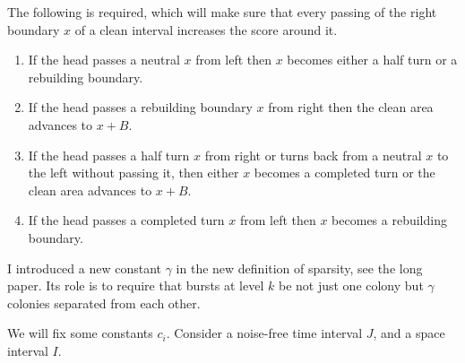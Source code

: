 \documentclass[12pt]{memoir}
\newcommand{\authnote}[3]
{\text{{ \textcolor{#3}{\( \langle\hspace{-0.2em}\langle \)\textsf{\footnotesize #1: #2}\( \rangle\hspace{-0.2em}\rangle \)}}}}
\newcommand{\authnote}[2]{}
\newcommand{\Pnote}[1]{{\authnote{P}{#1}{cyan}}}
\def\B{B}
\begin{document}
The following is required, which will make sure that every passing of the right
boundary \( x \) of a clean interval increases the score around it.

\begin{enumerate}
\item If the head passes a neutral \( x \) from left \Pnote{how far?}
then \( x \) becomes either a half turn or a rebuilding boundary.

\item If the head passes a rebuilding boundary \( x \) from right then \Pnote{how far?}
the clean area advances to \( x+\B \).

\item If the head passes a half turn \( x \) from right or turns back from a neutral \( x \)
to the left without passing it, then either \( x \) becomes
a completed turn or the clean area advances to \( x+\B \).

\item If the head passes a completed turn \( x \) from left then \( x \)
becomes a rebuilding boundary.

\end{enumerate}

I introduced a new constant \( \gamma \) 
in the new definition of sparsity, see the long paper.
Its role is to require that bursts at level \( k \) be
not just one colony but \( \gamma \) colonies separated from each other.

We will fix some  constants \( c_{i} \).
Consider a noise-free time interval \( J \), and a space interval \( I \).
\end{document}
